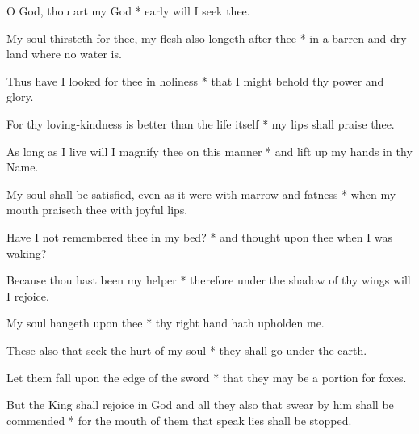 O God, thou art my God * early will I seek thee.

My soul thirsteth for thee, my flesh also longeth after thee * in a barren and dry land where no water is.

Thus have I looked for thee in holiness * that I might behold thy power and glory.

For thy loving-kindness is better than the life itself * my lips shall praise thee.

As long as I live will I magnify thee on this manner * and lift up my hands in thy Name.

My soul shall be satisfied, even as it were with marrow and fatness * when my mouth praiseth thee with joyful lips.

Have I not remembered thee in my bed? * and thought upon thee when I was waking?

Because thou hast been my helper * therefore under the shadow of thy wings will I rejoice.

My soul hangeth upon thee * thy right hand hath upholden me.

These also that seek the hurt of my soul * they shall go under the earth.

Let them fall upon the edge of the sword * that they may be a portion for foxes.

But the King shall rejoice in God and all they also that swear by him shall be commended * for the mouth of them that speak lies shall be stopped.
